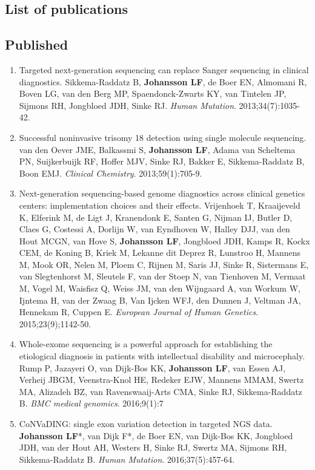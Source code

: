 \begin{appendices}
	\chapter{List of publications}
	
	\section*{Published}
	\begin{enumerate}
		\item Targeted next-generation sequencing can replace Sanger sequencing in clinical diagnostics. Sikkema-Raddatz B, \textbf{Johansson LF}, de Boer EN, Almomani R, Boven LG, van den Berg MP, Spaendonck-Zwarts KY, van Tintelen JP, Sijmons RH, Jongbloed JDH, Sinke RJ. \textsl{Human Mutation}. 2013;34(7):1035-42.
	\item Successful noninvasive trisomy 18 detection using single molecule sequencing. van den Oever JME, Balkassmi S, \textbf{Johansson LF}, Adama van Scheltema PN, Suijkerbuijk RF, Hoffer MJV, Sinke RJ, Bakker E, Sikkema-Raddatz B,  Boon EMJ. \textsl{Clinical Chemistry}. 2013;59(1):705-9.
	\item Next-generation sequencing-based genome diagnostics across clinical genetics centers: implementation choices and their effects. Vrijenhoek T, Kraaijeveld K, Elferink M, de Ligt J,  Kranendonk E, Santen G, Nijman IJ, Butler D, Claes G, Costessi A, Dorlijn W, van Eyndhoven W, Halley DJJ, van den Hout MCGN, van Hove S, \textbf{Johansson LF}, Jongbloed JDH, Kamps R, Kockx CEM, de Koning B, Kriek M, Lekanne dit Deprez R, Lunstroo H, Mannens M, Mook OR, Nelen M, Ploem C, Rijnen M, Saris JJ, Sinke R, Sistermans E, van Slegtenhorst M, Sleutels F, van der Stoep N, van Tienhoven M, Vermaat M, Vogel M, Waisfisz Q, Weiss JM, van den Wijngaard A, van Workum W, Ijntema H, van der Zwaag B, Van Ijcken WFJ, den Dunnen J, Veltman JA, Hennekam R, Cuppen E. \textsl{European Journal of Human Genetics}. 2015;23(9);1142-50.
	\item Whole-exome sequencing is a powerful approach for establishing the etiological diagnosis in patients with intellectual disability and microcephaly. Rump P, Jazayeri O, van Dijk-Bos KK, \textbf{Johansson LF}, van Essen AJ, Verheij JBGM, Veenstra-Knol HE, Redeker EJW, Mannens MMAM, Swertz MA, Alizadeh BZ, van Ravenswaaij-Arts CMA, Sinke RJ, Sikkema-Raddatz B. \textsl{BMC medical genomics}. 2016;9(1):7
	\item CoNVaDING: single exon variation detection in targeted NGS data. \textbf{Johansson LF}*, van Dijk F*, de Boer EN, van Dijk-Bos KK, Jongbloed JDH, van der Hout AH, Westers H, Sinke RJ, Swertz MA, Sijmons RH, Sikkema-Raddatz B. \textsl{Human Mutation}. 2016;37(5):457-64.

\end{enumerate}
\end{appendices}
